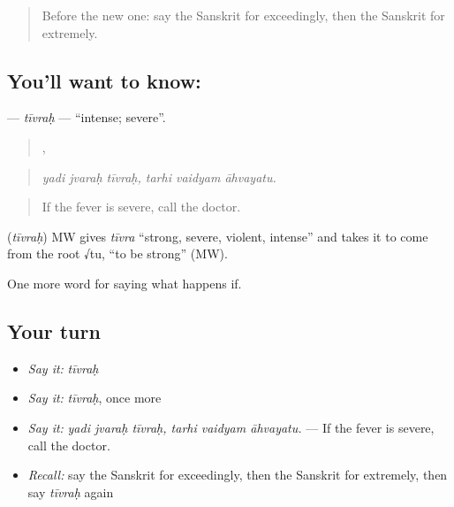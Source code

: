 \label{lesson:SA-C377-tivrah}



\begin{quote}
Before the new one: say the Sanskrit for exceedingly, then the Sanskrit for extremely.
\end{quote}

\subsection*{You'll want to know: }
\textbf{} — \emph{tīvraḥ} — \textquotedblleft{}intense; severe\textquotedblright{}.

\begin{quote}
  ,   
\end{quote}

\begin{quote}
\emph{yadi jvaraḥ tīvraḥ, tarhi vaidyam āhvayatu.}
\end{quote}

\begin{quote}
If the fever is severe, call the doctor.
\end{quote}

\begin{cousinweb}
\textbf{} (\emph{tīvraḥ}) MW gives \emph{tīvra} \textquotedblleft{}strong, severe, violent, intense\textquotedblright{} and takes it to come from the root √tu, \textquotedblleft{}to be strong\textquotedblright{} (MW).
\end{cousinweb}

\begin{grammarlens}[title={What you've built}]
One more word for saying what happens if.
\end{grammarlens}

\subsection*{Your turn}
\begin{itemize}
\raggedright
  \item \emph{Say it:} \emph{tīvraḥ}
  \item \emph{Say it:} \emph{tīvraḥ}, once more
  \item \emph{Say it:} \emph{yadi jvaraḥ tīvraḥ, tarhi vaidyam āhvayatu.} — If the fever is severe, call the doctor.
  \item \emph{Recall:} say the Sanskrit for exceedingly, then the Sanskrit for extremely, then say \emph{tīvraḥ} again
\end{itemize}

